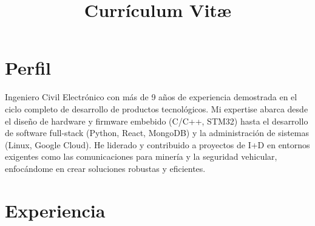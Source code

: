 \documentclass[11pt, a4paper]{moderncv}
\title{Currículum Vit\ae}
\begin{document}
\maketitle

\section{Perfil}
Ingeniero Civil Electrónico con más de 9 años de experiencia demostrada en el ciclo completo de desarrollo de productos tecnológicos. Mi expertise abarca desde el diseño de hardware y firmware embebido (C/C++, STM32) hasta el desarrollo de software full-stack (Python, React, MongoDB) y la administración de sistemas (Linux, Google Cloud). He liderado y contribuido a proyectos de I+D en entornos exigentes como las comunicaciones para minería y la seguridad vehicular, enfocándome en crear soluciones robustas y eficientes.

\section{Experiencia}
\end{document}
